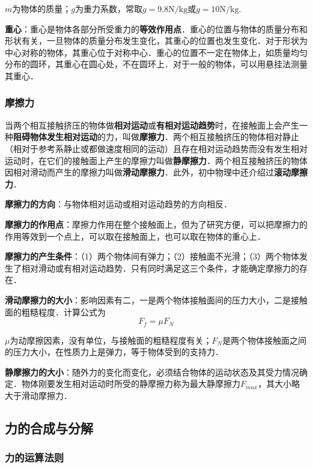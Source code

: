 $m$为物体的质量；$g$为重力系数，常取$g=9.8\mathrm{N/kg}$或$g=\mathrm{10N/kg}$.

\textbf{重心}：重心是物体各部分所受重力的\textbf{等效作用点}．重心的位置与物体的质量分布和形状有关，一旦物体的质量分布发生变化，其重心的位置也发生变化．对于形状为中心对称的物体，其重心位于对称中心．重心的位置不一定在物体上，如质量均匀分布的圆环，其重心在圆心处，不在圆环上．对于一般的物体，可以用悬挂法测量其重心．


\subsubsection{摩擦力}
当两个相互接触挤压的物体做\textbf{相对运动}或\textbf{有相对运动趋势}时，在接触面上会产生一种\textbf{阻碍物体发生相对运动}的力，叫做\textbf{摩擦力}．两个相互接触挤压的物体相对静止（相对于参考系静止或都做速度相同的运动）且存在相对运动趋势而没有发生相对运动时，在它们的接触面上产生的摩擦力叫做\textbf{静摩擦力}．两个相互接触挤压的物体因相对滑动而产生的摩擦力叫做\textbf{滑动摩擦力}．此外，初中物理中还介绍过\textbf{滚动摩擦力}．

\textbf{摩擦力的方向}：与物体相对运动或相对运动趋势的方向相反．

\textbf{摩擦力的作用点}：摩擦力作用在整个接触面上，但为了研究方便，可以把摩擦力的作用等效到一个点上，可以取在接触面上，也可以取在物体的重心上．

\textbf{摩擦力的产生条件}：（1）两个物体间有弹力；（2）接触面不光滑；（3）两个物体发生了相对滑动或有相对运动趋势．只有同时满足这三个条件，才能确定摩擦力的存在．

\textbf{滑动摩擦力的大小}：影响因素有二，一是两个物体接触面间的压力大小，二是接触面的粗糙程度．计算公式为
\begin{equation}
F_f=\mu F_N
\end{equation}

$\mu$为动摩擦因素，没有单位，与接触面的粗糙程度有关；$F_N$是两个物体接触面之间的压力大小，在性质力上是弹力，等于物体受到的支持力．

\textbf{静摩擦力的大小}：随外力的变化而变化，必须结合物体的运动状态及其受力情况确定．物体刚要发生相对运动时所受的静摩擦力称为最大静摩擦力$F_{max}$，其大小略大于滑动摩擦力．

\subsection{力的合成与分解}
\subsubsection{力的运算法则}

